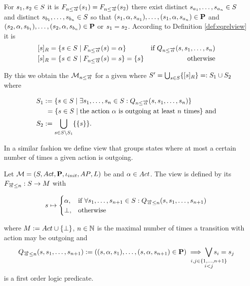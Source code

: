 \documentclass[preview]{standalone}
\begin{document}
For ${s}_1,{s}_2 \in {S}$ it is ${{F_{{n}\leq{\overrightarrow{\ensuremath{{\alpha}}}}}}}({s}_1) = {{F_{{n}\leq{\overrightarrow{\ensuremath{{\alpha}}}}}}}({s}_2)$ \iffN there exist distinct ${s}_{a_1}, \dots, {s}_{a_{n}} \in {S}$ and distinct ${s}_{b_1}, \dots, {s}_{b_{n}} \in {S}$ so that $({s}_1, {\alpha}, {s}_{a_1}), \dots, ({s}_1, {\alpha}, {s}_{a_{n}}) \in {\ensuremath{{\textbf{P}}}}$ and $({s}_2, {\alpha}, {s}_{b_1}), \dots, ({s}_2, {\alpha}, {s}_{b_{n}}) \in {\ensuremath{{\textbf{P}}}}$ or ${s}_1 = {s}_2$. According to Definition \ref{def:eqrelview} it is 
\begin{align*}
	\eqclassv &= \{\state \in \states \mid \gfctminoutaction(\state) = \action\} &\text{if } \predminoutact \\ 
	\eqclassv &= \{\state \in \states \mid \gfctminoutaction(\state) = \state\} = \{\state\} &\text{ otherwise}
\end{align*}

By this we obtain the \viewN ${{{{{\mathcal{M}}}}_{{n}\leq{\overrightarrow{\ensuremath{{\alpha}}}}}}}$ for a given \chosengraphtypeN \chgph where ${S}' = \bigcup_{{s} \in {S}} \{{{[{s}]_{{R}}}}\} =: {S}_1 \cup {S}_2$ where 

\begin{align*}
	\states_1 &:= \{\state \in \states \mid \exists \state_1, \dots, \state_\numoutact \in \states: \predminoutact\} \\ %
	&\hspace{1.15mm}= \{\state \in \states \mid \text{the action } \action \text{ is outgoing at least } \numoutact \text{ times} \} \text{ and} \\
	\states_2 &:= \remstates.	
\end{align*}

In a similar fashion we define view that groups states where at most a certain number of times a given action is outgoing. 

\begin{definition}
	Let ${{{\mathcal{M}}}} = {{({S}, {Act}, {\textbf{P}}, {\iota_{init}}, {AP}, {L})}}$ be \chosengraphtypeN and ${\alpha} \in {Act}$. The view \viewmaxoutaction is defined by its \grpfctN ${{F_{{\overrightarrow{{\alpha}}}\leq{n}}}} : {S} \to {M}$ with
	
	\[
	{s} \mapsto
	\begin{cases}
		{\alpha},				& \text{if } \forall {s}_1, \dots, {s}_{{n}+1} \in {S}: {Q_{{\overrightarrow{{\alpha}}}\leq{n}}({s},{s}_1, \dots, {s}_{{n}+1})} \\
		{\bot},          	& \text{otherwise}
	\end{cases}
	\]
	
	where ${{M}} := {Act} \cup {\{\bot\}}$, ${n} \in {\mathbb{N}}$ is the maximal number of times a transition with action \action may be outgoing and 
	\[
	\predmaxoutact := ((\state, \action, \state_1), \dots, (\state, \action, \state_{\numoutact+1}) \in \trans) \implies \bigvee_{\mathclap{\substack{i,j \in \{1,\dots, \numoutact+1\} \\ i < j}}} \state_i = \state_j
	\]
	is a first order logic predicate.
	\label{def:viewmaxoutaction}
\end{definition}
\end{document}
